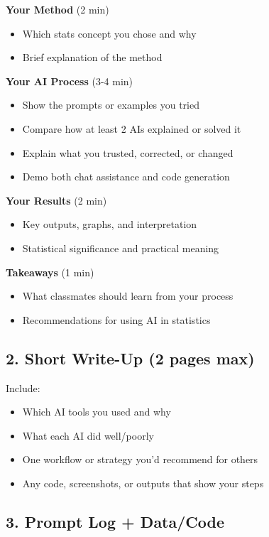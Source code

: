 \documentclass[11pt]{article}
\begin{document}
\textbf{Your Method} (2 min)
\begin{itemize}
\item Which stats concept you chose and why
\item Brief explanation of the method
\end{itemize}

\textbf{Your AI Process} (3-4 min)
\begin{itemize}
\item Show the prompts or examples you tried
\item Compare how at least 2 AIs explained or solved it
\item Explain what you trusted, corrected, or changed
\item Demo both chat assistance and code generation
\end{itemize}

\textbf{Your Results} (2 min)
\begin{itemize}
\item Key outputs, graphs, and interpretation
\item Statistical significance and practical meaning
\end{itemize}

\textbf{Takeaways} (1 min)
\begin{itemize}
\item What classmates should learn from your process
\item Recommendations for using AI in statistics
\end{itemize}

\subsection{2. Short Write-Up (2 pages max)}

Include:
\begin{itemize}
\item Which AI tools you used and why
\item What each AI did well/poorly
\item One workflow or strategy you'd recommend for others
\item Any code, screenshots, or outputs that show your steps
\end{itemize}

\subsection{3. Prompt Log + Data/Code}
\end{document}
